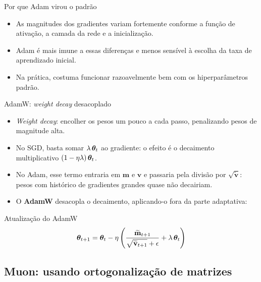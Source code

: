 \documentclass[aspectratio=169,xcolor=dvipsnames]{beamer}
\begin{document}
  \begin{frame}{Por que Adam virou o padrão}
    \begin{itemize}
      \item As magnitudes dos gradientes variam fortemente conforme a função de ativação,
        a camada da rede e a inicialização.
      \item Adam é mais imune a essas diferenças e menos sensível à escolha da taxa de
        aprendizado inicial.
      \item Na prática, costuma funcionar razoavelmente bem com os hiperparâmetros padrão.
    \end{itemize}
  \end{frame}

  \begin{frame}{AdamW: \textit{weight decay} desacoplado}
    \begin{itemize}
      \item \textit{Weight decay}: encolher os pesos um pouco a cada passo, penalizando
        pesos de magnitude alta.
      \item No SGD, basta somar $\lambda\,\bm{\theta}_t$ ao gradiente: o efeito é o decaimento
        multiplicativo $(1-\eta\lambda)\,\bm{\theta}_t$.
      \item No Adam, esse termo entraria em $\mathbf{m}$ e $\mathbf{v}$ e passaria pela divisão por
        $\sqrt{\widetilde{\mathbf{v}}}$: pesos com histórico de gradientes grandes quase não decairiam.
      \item O \textbf{AdamW} desacopla o decaimento, aplicando-o fora da parte adaptativa:
    \end{itemize}
    \begin{block}{Atualização do AdamW}
      \[
        \bm{\theta}_{t+1}=\bm{\theta}_{t}-\eta\left(\frac{\widetilde{\mathbf{m}}_{t+1}}{\sqrt{\widetilde{\mathbf{v}}_{t+1}}+\epsilon}
        + \lambda\,\bm{\theta}_{t}\right)
      \]
    \end{block}
  \end{frame}

  \subsection{Muon: usando ortogonalização de matrizes}
\end{document}
